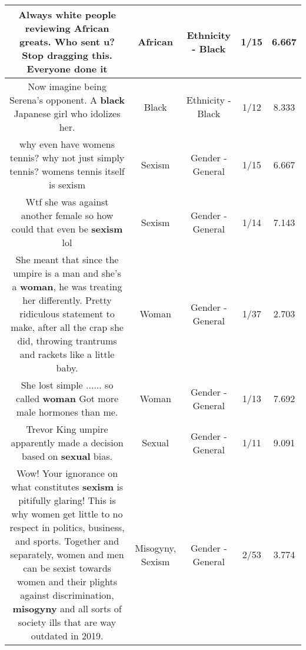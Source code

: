 \documentclass[11pt]{article}
\newlength\mylength
\begin{document}
\begin{center}
\begin{longtable}{|C{.65\mylength}|C{.30\mylength}|C{.12\mylength}|C{.12\mylength}|C{.12\mylength}|}
  \small Always white people reviewing \textbf{African} greats. Who sent u? Stop dragging this. Everyone done it\normalsize   & African & Ethnicity - Black & 1/15 & 6.667 \\  \hline
  \small Now imagine being Serena's opponent. A \textbf{black} Japanese girl who idolizes her.\normalsize   & Black & Ethnicity - Black & 1/12 & 8.333 \\  \hline
  \small why even have womens tennis? why not just simply tennis? womens tennis itself is sexism\normalsize   & Sexism & Gender - General & 1/15 & 6.667 \\  \hline
  \small Wtf she was against another female so how could that even be \textbf{sexism} lol\normalsize   & Sexism & Gender - General & 1/14 & 7.143 \\  \hline
  \small She meant that since the umpire is a man and she's a \textbf{woman}, he was treating her differently. Pretty ridiculous statement to make, after all the crap she did, throwing trantrums and rackets like a little baby.\normalsize   & Woman & Gender - General & 1/37 & 2.703 \\  \hline
  \small She lost simple ...... so called \textbf{woman} Got more male hormones than me.\normalsize   & Woman & Gender - General & 1/13 & 7.692 \\  \hline
  \small Trevor King umpire apparently made a decision based on \textbf{sexual} bias.\normalsize   & Sexual & Gender - General & 1/11 & 9.091 \\  \hline
  \small Wow!  Your ignorance on what constitutes \textbf{sexism} is pitifully glaring!  This is why women get little to no respect in politics, business, and sports.  Together and separately, women and men can be sexist towards women and their plights against discrimination, \textbf{misogyny} and all sorts of society ills that are way outdated in 2019.\normalsize   & Misogyny, Sexism & Gender - General & 2/53 & 3.774 \\  \hline

\end{longtable}
\end{center}
\end{document}
